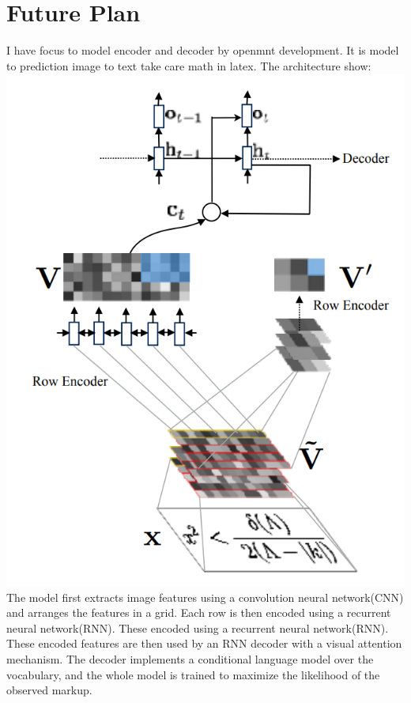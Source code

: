 \documentclass[14pt]{extarticle}
\newcommand{\<}{\langle}
\renewcommand{\>}{\rangle}
\theoremstyle{definition}
\begin{document}
\section{Future Plan}
I have focus to model encoder and decoder by openmnt development. It is model to prediction image to text take care math in latex. The architecture show: \newline
\includegraphics[width=170mm,scale=0.7]{openmnt.png}
The model first extracts image features using a convolution neural network(CNN) and arranges the features in a grid. Each row is then encoded using a recurrent neural network(RNN). These encoded using a recurrent neural network(RNN). These encoded features are then used by an RNN decoder with a visual attention mechanism. The decoder implements a conditional language model over the vocabulary, and the whole model is trained to maximize the likelihood of the observed markup. \cite{openmnt}




\end{document}
